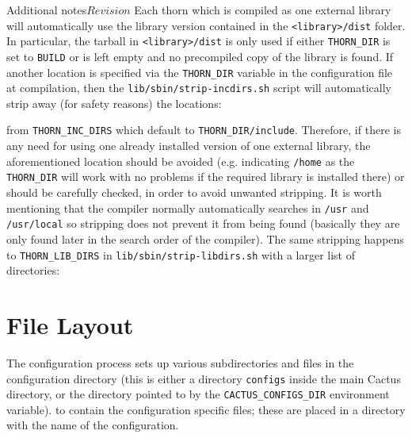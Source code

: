 \begin{cactuspart}{Additional notes}{}{$Revision$}
Each thorn which is compiled as one external library
will automatically use the library version contained in the
\texttt{<library>/dist} folder. In particular, the tarball in
\texttt{<library>/dist} is only used if either \texttt{THORN\_DIR} is
set to \texttt{BUILD} or is left empty and no precompiled copy of the
library is found. If another location is specified via the
\texttt{THORN\_DIR} variable in the configuration file at
compilation, then the \texttt{lib/sbin/strip-incdirs.sh} script will
automatically strip away (for safety reasons) the locations:
\begin{Lentry}
\item [\texttt{/include}]
\item [\texttt{/usr/include}]
\item [\texttt{/usr/local/include}]
\end{Lentry}
from \texttt{THORN\_INC\_DIRS} which default to
\texttt{THORN\_DIR/include}. Therefore, if there is any need for using
one already installed version of one external library, the
aforementioned location should be avoided (e.g. indicating
\texttt{/home} as the \texttt{THORN\_DIR} will work with no problems
if the required library is installed there) or should be carefully
checked, in order to avoid unwanted stripping. It is worth mentioning
that the compiler normally automatically searches in \texttt{/usr} and
\texttt{/usr/local} so stripping does not prevent it from being
found (basically they are only found later in the search order of
the compiler). The same stripping happens to \texttt{THORN\_LIB\_DIRS}
in \texttt{lib/sbin/strip-libdirs.sh} with a larger list of directories:
\begin{Lentry}
\item [\texttt{/lib}]
\item [\texttt{/usr/lib}]
\item [\texttt{/usr/local/lib}]
\item [\texttt{/lib64}]
\item [\texttt{/usr/lib64}]
\item [\texttt{/usr/local/lib64}]
\end{Lentry}

\section{File Layout}
\label{file_layout}

The configuration process sets up various subdirectories and files in the
configuration
directory (this is either a directory
\texttt{configs} inside the main Cactus directory, or the
directory pointed to by the \texttt{CACTUS\_CONFIGS\_DIR} environment
variable).
to contain the configuration specific files; these
are placed in a directory with the name of the configuration.


\end{cactuspart}
